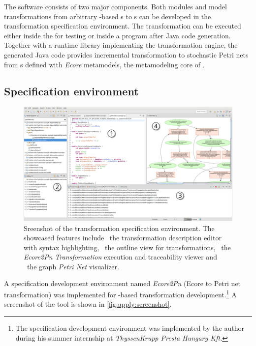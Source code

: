 The software consists of two major components. Both  modules and model transformations from arbitrary -based s to s can be developed in the transformation specification environment. The transformation can be executed either inside the  for testing or inside a  program after Java code generation. Together with a runtime library implementing the transformation engine, the generated Java code provides incremental transformation to stochastic Petri nets from s defined with \emph{Ecore} metamodels, the metamodeling core of .

\subsection{Specification environment}
\label{sec:apply:environment}

\begin{figure}
  \centering
  \includegraphics[width={\dimexpr\textwidth-2\fboxrule},frame]{figures/annotated_screenshot}
  \caption{Sreenshot of the transformation specification environment. The showcased features include ~the transformation description editor with syntax highlighting, ~the outline view for transformations, ~the \emph{Ecore2Pn Transformation} execution and traceability viewer and ~the  graph \emph{Petri Net} visualizer.}
  \label{fig:apply:screenshot}
\end{figure}

A specification development environment named \emph{Ecore2Pn} (Ecore to Petri net transformation) was implemented for -based transformation development.\footnote{The specification development environment was implemented by the author during his summer internship at \emph{ThyssenKrupp Presta Hungary Kft.}} A screenshot of the tool is shown in \vref{fig:apply:screenshot}.

